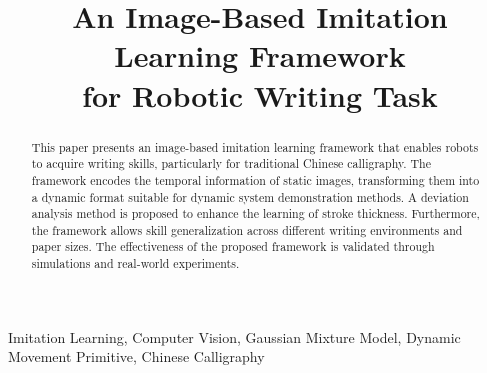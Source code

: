 \documentclass[conference]{IEEEtran}
\begin{document}
\title{An Image-Based Imitation Learning Framework \\ for Robotic Writing Task}
\author{
\and
{}
}
\maketitle
\begin{abstract}
This paper presents an image-based imitation learning framework that enables robots to acquire writing skills, particularly for traditional Chinese calligraphy. The framework encodes the temporal information of static images, transforming them into a dynamic format suitable for dynamic system demonstration methods. A deviation analysis method is proposed to enhance the learning of stroke thickness. Furthermore, the framework allows skill generalization across different writing environments and paper sizes. The effectiveness of the proposed framework is validated through simulations and real-world experiments.
\end{abstract}

\begin{IEEEkeywords}
Imitation Learning, Computer Vision, Gaussian Mixture Model, Dynamic Movement Primitive, Chinese Calligraphy
\end{IEEEkeywords}
\end{document}
